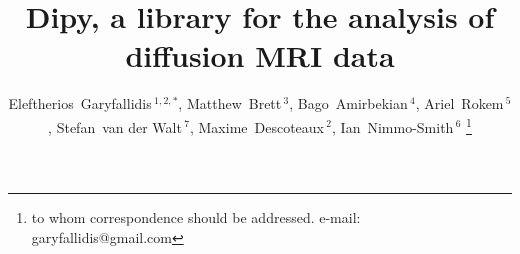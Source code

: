 \documentclass{bioinfo}
\begin{document}

\title[QuickBundles]{Dipy, a library for the analysis of diffusion MRI data}

\author[Garyfallidis, Brett, Amirbekian, Rokem,  van der Walt, Descoteaux, 
Nimmo-Smith]{Eleftherios~Garyfallidis\,$^{1,2,*}$, Matthew~Brett\,$^{3}$,
  Bago~Amirbekian\,$^{4}$, Ariel~Rokem\,$^{5}$, Stefan~van der Walt\,$^{7}$, Maxime~Descoteaux\,$^{2}$, Ian~Nimmo-Smith\,$^{6}$ \footnote{to whom correspondence should be addressed. e-mail: garyfallidis@gmail.com}}

\address{\,$^{1}$University of Cambridge, Cambridge, UK\\
  \,$^{2}$University of Sherbrooke, Sherbrooke, CA\\ 
  \,$^{3}$University of California, Henry H. Wheeler, Jr. Brain Imaging Center, Berkeley, CA.\\
  \,$^{4}$University of California, San Francisco, CA, USA\\    
  \,$^{5}$Stanford University, Stanford, CA, USA\\
  \,$^{6}$MRC Cognition and Brain Sciences Unit, Cambridge, UK\\
  \,$^{7}$Stellenbosch University, Stellenbosch, South Africa\\  
  }


\history{}

\editor{}

\maketitle
\end{document}

